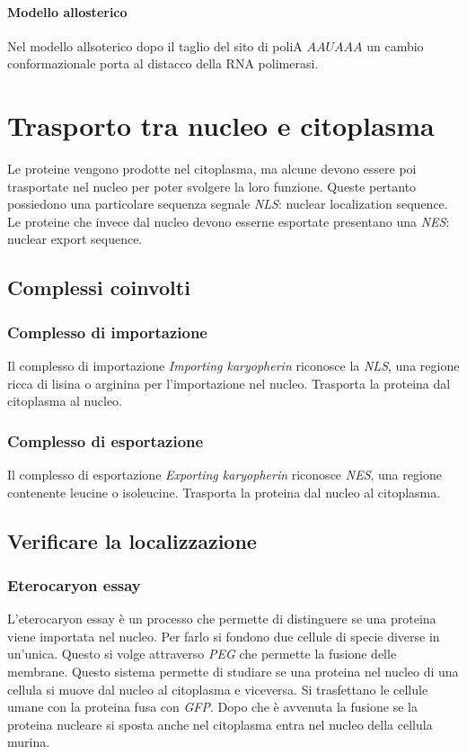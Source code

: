 			\paragraph{Modello allosterico}
			Nel modello allsoterico dopo il taglio del sito di poliA $AAUAAA$ un cambio conformazionale porta al distacco della RNA polimerasi.


\section{Trasporto tra nucleo e citoplasma}
Le proteine vengono prodotte nel citoplasma, ma alcune devono essere poi trasportate nel nucleo per poter svolgere la loro funzione.
Queste pertanto possiedono una particolare sequenza segnale \emph{NLS}: nuclear localization sequence.
Le proteine che invece dal nucleo devono esserne esportate presentano una \emph{NES}: nuclear export sequence.

	\subsection{Complessi coinvolti}

		\subsubsection{Complesso di importazione}
		Il complesso di importazione \emph{Importing karyopherin} riconosce la \emph{NLS}, una regione ricca di lisina o arginina per l'importazione nel nucleo.
		Trasporta la proteina dal citoplasma al nucleo.

		\subsubsection{Complesso di esportazione}
		Il complesso di esportazione \emph{Exporting karyopherin} riconosce \emph{NES}, una regione contenente leucine o isoleucine.
		Trasporta la proteina dal nucleo al citoplasma.

	\subsection{Verificare la localizzazione}

		\subsubsection{Eterocaryon essay}
		L'eterocaryon essay \`e un processo che permette di distinguere se una proteina viene importata nel nucleo.
		Per farlo si fondono due cellule di specie diverse in un'unica.
		Questo si volge attraverso \emph{PEG} che permette la fusione delle membrane.
		Questo sistema permette di studiare se una proteina nel nucleo di una cellula si muove dal nucleo al citoplasma e viceversa.
		Si trasfettano le cellule umane con la proteina fusa con \emph{GFP}.
		Dopo che \`e avvenuta la fusione se la proteina nucleare si sposta anche nel citoplasma entra nel nucleo della cellula murina.

